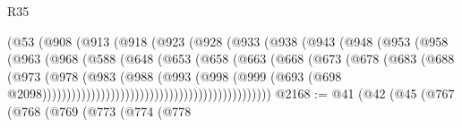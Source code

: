 \begin{lexlean}{R35}
\begin{coremodule}
                                (@53
                                  (@908
                                    (@913
                                      (@918
                                        (@923
                                          (@928
                                            (@933
                                              (@938
                                                (@943
                                                  (@948
                                                    (@953
                                                      (@958
                                                        (@963
                                                          (@968
                                                            (@588
                                                              (@648
                                                                (@653
                                                                  (@658
                                                                    (@663
                                                                      (@668
                                                                        (@673
                                                                          (@678
                                                                            (@683
                                                                              (@688
                                                                                (@973
                                                                                  (@978
                                                                                    (@983
                                                                                      (@988
                                                                                        (@993
                                                                                          (@998
                                                                                            (@999
                                                                                              (@693
                                                                                                (@698
                                                                                                  @2098)))))))))))))))))))))))))))))))))))))))))))))))
@2168 := @41
    (@42
      (@45
        (@767
          (@768
            (@769
              (@773
                (@774
                  (@778

\end{coremodule}
\end{lexlean}
